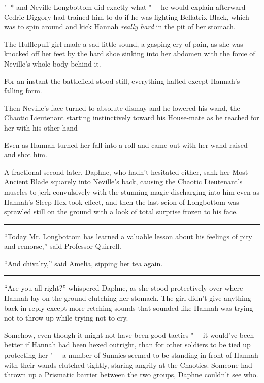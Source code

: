 "--* and Neville Longbottom did exactly what "--- he would explain afterward -
Cedric Diggory had trained him to do if he was fighting Bellatrix Black,
which was to spin around and kick Hannah \emph{really hard} in the pit
of her stomach.

The Hufflepuff girl made a sad little sound, a gasping cry of pain, as
she was knocked off her feet by the hard shoe sinking into her abdomen
with the force of Neville's whole body behind it.

For an instant the battlefield stood still, everything halted except
Hannah's falling form.

Then Neville's face turned to absolute dismay and he lowered his wand,
the Chaotic Lieutenant starting instinctively toward his House-mate as
he reached for her with his other hand -

Even as Hannah turned her fall into a roll and came out with her wand
raised and shot him.

A fractional second later, Daphne, who hadn't hesitated either, sank her
Most Ancient Blade squarely into Neville's back, causing the Chaotic
Lieutenant's muscles to jerk convulsively with the stunning magic
discharging into him even as Hannah's Sleep Hex took effect, and then
the last scion of Longbottom was sprawled still on the ground with a
look of total surprise frozen to his face.

\begin{center}\rule{3in}{0.4pt}\end{center}

``Today Mr. Longbottom has learned a valuable lesson about his feelings
of pity and remorse,'' said Professor Quirrell.

``And chivalry,'' said Amelia, sipping her tea again.

\begin{center}\rule{3in}{0.4pt}\end{center}

``Are you all right?'' whispered Daphne, as she stood protectively over
where Hannah lay on the ground clutching her stomach. The girl didn't
give anything back in reply except more retching sounds that sounded
like Hannah was trying not to throw up while trying not to cry.

Somehow, even though it might not have been good tactics "--- it would've
been better if Hannah had been hexed outright, than for other soldiers
to be tied up protecting her "--- a number of Sunnies seemed to be standing
in front of Hannah with their wands clutched tightly, staring angrily at
the Chaotics. Someone had thrown up a Prismatic barrier between the two
groups, Daphne couldn't see who.

